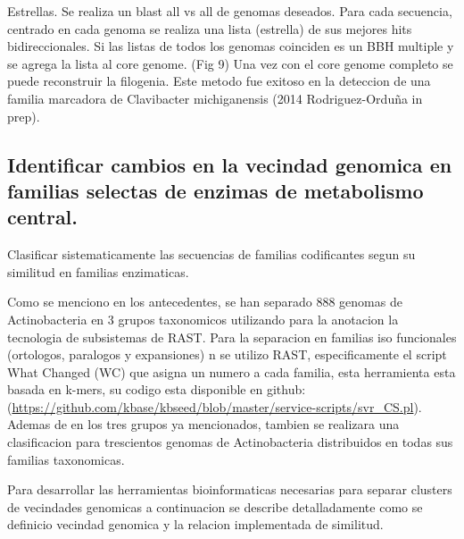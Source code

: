 \documentclass[12pt,twoside]{reedthesis}
\begin{document}
  Estrellas. Se realiza un blast all vs all de genomas deseados. Para cada
  secuencia, centrado en cada genoma se realiza una lista (estrella) de
  sus mejores hits bidireccionales. Si las listas de todos los genomas
  coinciden es un BBH multiple y se agrega la lista al core genome. (Fig
  9) Una vez con el core genome completo se puede reconstruir la
  filogenia. Este metodo fue exitoso en la deteccion de una familia
  marcadora de Clavibacter michiganensis (2014 Rodriguez-Orduña in prep).
  
  \subsection{Identificar cambios en la vecindad genomica en familias
  selectas de enzimas de metabolismo
  central.}\label{identificar-cambios-en-la-vecindad-genomica-en-familias-selectas-de-enzimas-de-metabolismo-central.-1}
  
  Clasificar sistematicamente las secuencias de familias codificantes
  segun su similitud en familias enzimaticas.
  
  Como se menciono en los antecedentes, se han separado 888 genomas de
  Actinobacteria en 3 grupos taxonomicos utilizando para la anotacion la
  tecnologia de subsistemas de RAST. Para la separacion en familias iso
  funcionales (ortologos, paralogos y expansiones) n se utilizo RAST,
  especificamente el script What Changed (WC) que asigna un numero a cada
  familia, esta herramienta esta basada en k-mers, su codigo esta
  disponible en github:
  (\url{https://github.com/kbase/kbseed/blob/master/service-scripts/svr_CS.pl}).
  Ademas de en los tres grupos ya mencionados, tambien se realizara una
  clasificacion para trescientos genomas de Actinobacteria distribuidos en
  todas sus familias taxonomicas.
  
  Para desarrollar las herramientas bioinformaticas necesarias para
  separar clusters de vecindades genomicas a continuacion se describe
  detalladamente como se definicio vecindad genomica y la relacion
  implementada de similitud.
  
\end{document}
